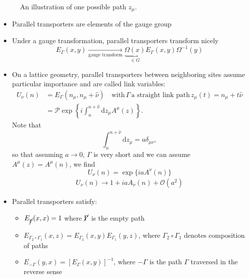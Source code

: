 \begin{figure}
    \centering
    \caption{An illustration of one possible path $z_\mu$.}
    \label{fig:parallel_transporter}
\end{figure}
\begin{itemize}
\item Parallel transporters are elements of the gauge group
\item Under a gauge transformation, parallel transporters transform nicely
\begin{equation}
   \boxed{E_\Gamma(x,y) \underset{\text{gauge transform}}{\longrightarrow} \underset{\in G}{\underbrace{\Omega(x)}} E_\Gamma(x,y) \Omega^{-1}(y)}
\end{equation}
\item On a lattice geometry, parallel transporters between neighboring sites assume particular importance and are called link variables:
\begin{align}
    U_\nu(n) &= E_\Gamma(n_\mu, n_\mu + \hat{\nu}) \quad \text{with} \, \Gamma \, \text{a straight link path} \, z_\mu(t) = n_\mu + t\hat{\nu} \nonumber \\
    &= \mathcal{P} \exp \left\{ i \int_n^{n + \hat{\nu}} \text{d}z_\mu A^\mu(z) \right\}.
\end{align}
Note that
\begin{equation}
    \int_n ^{n+\hat{\nu}} \text{d}z_\mu = a \delta_{\mu \nu},
\end{equation}
so that assuming $a \rightarrow 0$, $\Gamma$ is very short and we can assume $A^\mu(z) = A^\mu(n)$, we find
\begin{equation}
    \boxed{U_\nu(n) = \exp \{i a A^\nu(n) \} }
\end{equation}
 \begin{align}
   U_\nu(n) \rightarrow 1 + i a A_\nu(n) + \mathcal{O}(a^2)
\end{align}
\item Parallel transporters satisfy:
\begin{itemize}
    \item $E_{\cancel{\Gamma}}(x,x) = 1$ where $\cancel{\Gamma}$ is the empty path
    \item $E_{\Gamma_2 \circ \Gamma_1}(x,z) = E_{\Gamma_2}(x,y)E_{\Gamma_1}(y,z)$, where $\Gamma_2 \circ \Gamma_1$ denotes composition of paths
    \item $E_{-\Gamma}(y,x) = \left[E_\Gamma(x,y) \right]^{-1}$, where $-\Gamma$ is the path $\Gamma$ traversed in the reverse sense

\end{itemize}
\end{itemize}
